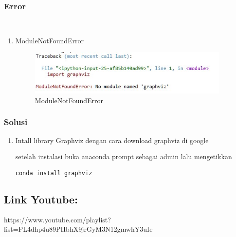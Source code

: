 \subsubsection{Error}
\hfill\\
\begin{enumerate}
\item ModuleNotFoundError

\begin{figure}[H]
\centerline{\includegraphics[width=10cm]{figures/1174067/2/error1.jpg}}
\caption{ModuleNotFoundError}
\label{labelgambar}
\end{figure}
\end{enumerate}

\subsubsection{Solusi}
\begin{enumerate}
\item Intall library Graphviz dengan cara download graphviz di google

setelah instalasi buka anaconda prompt sebagai admin lalu mengetikkan
\begin{lstlisting}
conda install graphviz
\end{lstlisting} 
\end{enumerate}

\subsection{Link Youtube:}
https://www.youtube.com/playlist?list=PL4dhp4u89PHbhX9jrGyM3N12gmwhY3uIe
